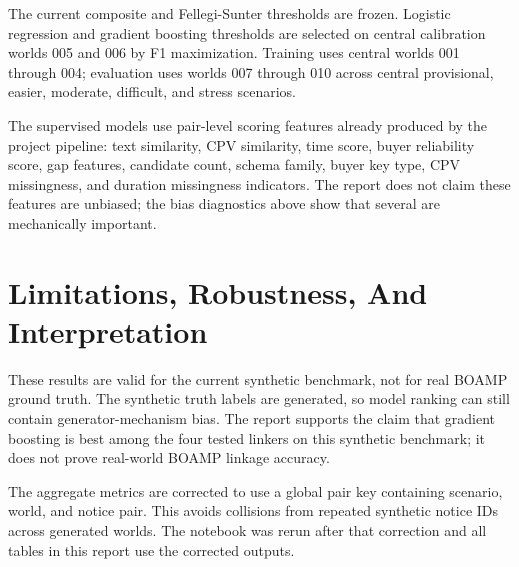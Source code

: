 \documentclass[11pt]{article}
\begin{document}
The current composite and Fellegi-Sunter thresholds are frozen. Logistic regression and gradient
boosting thresholds are selected on central calibration worlds 005 and 006 by F1 maximization. Training
uses central worlds 001 through 004; evaluation uses worlds 007 through 010 across central provisional,
easier, moderate, difficult, and stress scenarios.

\begin{table}[H]
\centering
\caption{Algorithm score columns and thresholds used in the executed benchmark.}
\label{tab:thresholds}
\end{table}

The supervised models use pair-level scoring features already produced by the project pipeline: text
similarity, CPV similarity, time score, buyer reliability score, gap features, candidate count, schema
family, buyer key type, CPV missingness, and duration missingness indicators. The report does not claim
these features are unbiased; the bias diagnostics above show that several are mechanically important.

\section*{Limitations, Robustness, And Interpretation}

These results are valid for the current synthetic benchmark, not for real BOAMP ground truth. The
synthetic truth labels are generated, so model ranking can still contain generator-mechanism bias. The
report supports the claim that gradient boosting is best among the four tested linkers on this synthetic
benchmark; it does not prove real-world BOAMP linkage accuracy.

The aggregate metrics are corrected to use a global pair key containing scenario, world, and notice
pair. This avoids collisions from repeated synthetic notice IDs across generated worlds. The notebook
was rerun after that correction and all tables in this report use the corrected outputs.
\end{document}
